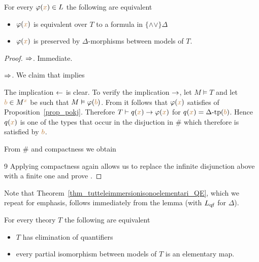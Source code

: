 \begin{lemma}\label{lem_qfdefinability}
For every $\varphi({\color{brown} x})\in L$ the following are equivalent
\begin{itemize}
\item[1.] $\varphi({\color{brown} x})$ is equivalent over $T$ to a formula in $\{\mathord\wedge\mathord\vee\}\Delta$
\item[2.] $\varphi({\color{brown} x})$ is preserved by $\Delta$-morphisms between models of $T$.
\end{itemize}
\end{lemma}
\begin{proof} $\Rightarrow$. Immediate.

$\Rightarrow$.  We claim that  implies


The implication $\leftarrow$ is clear.
To verify the implication $\rightarrow$, let $M\models T$ and let ${\color{brown} b}\in M^{\color{brown} x}$ be such that $M\vDash\varphi({\color{brown} b})$.
From  it follows that $\varphi({\color{brown} x})$ satisfies  of Proposition~\ref{prop_pokj}.
Therefore $T\vdash q({\color{brown} x})\rightarrow\varphi({\color{brown} x})$ for $q({\color{brown} x})=\Delta\mbox{\rm -tp}({\color{brown} b})$.
Hence $q({\color{brown} x})$ is one of the types that occur in the disjuction in $\#$ which therefore is satisfied by ${\color{brown} b}$.

From $\#$ and compactness we obtain

9
Applying compactness again allows us to replace the infinite disjunction above with a finite one and prove .
\end{proof}

\begin{remark}\label{rem_prove_thm_EQ}
  Note that Theorem~\ref{thm_tutteleimmersionisonoelementari_QE}, which we repeat for emphasis, follows immediately from the lemma (with $L_{\rm qf}$ for $\Delta$).\smallskip

  For every theory $T$ the following are equivalent
  \begin{itemize}
  \item[1.] $T$ has elimination of quantifiers
  \item[2.] every partial isomorphism between models of $T$ is an elementary map.
  \end{itemize}
\end{remark}

